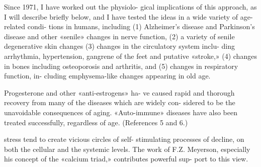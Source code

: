\documentclass[10pt]{memoir}
\begin{document}
\begin{multicols}{2}
	\bigskip

	\noindent Since 1971, I have worked out the physiolo-\linebreak
	gical implications of this approach, as I will\linebreak
	describe briefly below, and I have tested the\linebreak
	ideas in a wide variety of age-related condi-\linebreak
	tions in humans, including (1) Alzheimer's\linebreak
	disease and Parkinson's disease and other\linebreak
	«senile» changes in nerve function, (2) a\linebreak
	variety of senile degenerative skin changes\linebreak
	(3) changes in the circulatory system inclu-\linebreak
	ding arrhythmia, hypertension, gangrene of\linebreak
	the feet and putative «stroke,» (4) changes\linebreak
	in bones including osteoporosis and arthritis,\linebreak
	and (5) changes in respiratory function, in-\linebreak
	cluding emphysema-like changes appearing in\linebreak
	old age.

	\bigskip

	\noindent Progesterone and other «anti-estrogens» ha-\linebreak
	ve caused rapid and thorough recovery from\linebreak
	many of the diseases which are widely con-\linebreak
	sidered to be the unavoidable consequences\linebreak
	of aging. «Auto-immune» diseases have also\linebreak
	been treated successfully, regardless of age.\linebreak
	(References 5 and 6.)

	\bigskip


	\columnbreak

	\noindent stress tend to create vicious circles of self-\linebreak
	stimulating processes of decline, on both\linebreak
	the cellular and the systemic levels. The work\linebreak
	of F.Z. Meyerson, especially his concept of\linebreak
	the «calcium triad,» contributes powerful sup-\linebreak
	port to this view.


\end{multicols}
\end{document}
